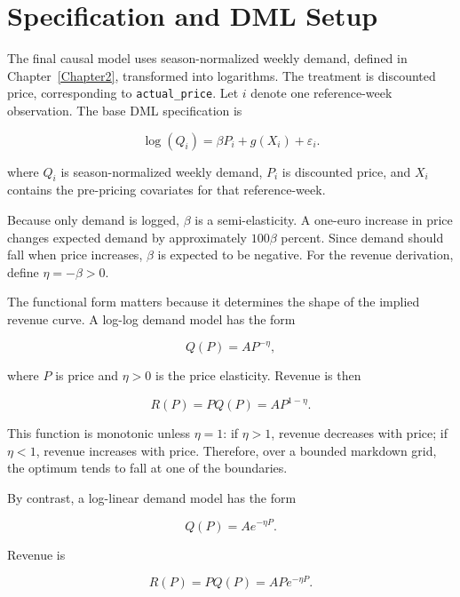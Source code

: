 \section{Specification and DML Setup}
\label{sec:specification-dml}

The final causal model uses season-normalized weekly demand, defined in Chapter~\ref{Chapter2}, transformed into logarithms. The treatment is discounted price, corresponding to \texttt{actual\_price}. Let $i$ denote one reference-week observation. The base DML specification is

\begin{equation}
\log(Q_i) = \beta P_i + g(X_i) + \varepsilon_i.
\label{eq:final_spec}
\end{equation}

where $Q_i$ is season-normalized weekly demand, $P_i$ is discounted price, and $X_i$ contains the pre-pricing covariates for that reference-week.

Because only demand is logged, $\beta$ is a semi-elasticity. A one-euro increase in price changes expected demand by approximately $100\beta$ percent. Since demand should fall when price increases, $\beta$ is expected to be negative. For the revenue derivation, define $\eta=-\beta>0$.

The functional form matters because it determines the shape of the implied revenue curve. A log-log demand model has the form

\begin{equation}
Q(P)=AP^{-\eta},
\end{equation}

where $P$ is price and $\eta>0$ is the price elasticity. Revenue is then

\begin{equation}
R(P)=P Q(P)=AP^{1-\eta}.
\end{equation}

This function is monotonic unless $\eta=1$: if $\eta>1$, revenue decreases with price; if $\eta<1$, revenue increases with price. Therefore, over a bounded markdown grid, the optimum tends to fall at one of the boundaries.

By contrast, a log-linear demand model has the form

\begin{equation}
Q(P)=Ae^{-\eta P}.
\end{equation}

Revenue is

\begin{equation}
R(P)=P Q(P)=APe^{-\eta P}.
\end{equation}

